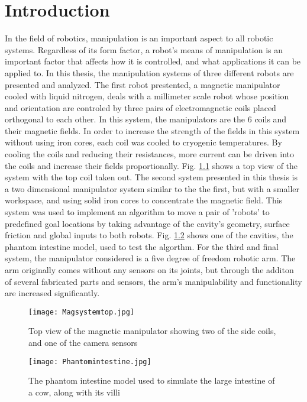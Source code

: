 
\chapter[Introduction]{Introduction}
\label{chap-intro}

In the field of robotics, manipulation is an important aspect to all robotic systems. Regardless of its form factor, a robot's means of manipulation is an important factor that affects how it is controlled, and what applications it can be applied to. In this thesis, the manipulation systems of three different robots are presented and analyzed. The first robot prestented, a magnetic manipulator cooled with liquid nitrogen, deals with a millimeter scale robot whose position and orientation are controled by three pairs of electromagnetic coils placed orthogonal to each other. In this system, the manipulators are the 6 coils and their magnetic fields. In order to increase the strength of the fields in this system without using iron cores, each coil was cooled to cryogenic temperatures.  By cooling the coils and reducing their resistances, more current can be driven into the coils and increase their fields proportionally.  Fig. \ref{MagTopPic} shows a top view of the system with the top coil taken out.  The second system presented in this thesis is a two dimensional manipulator system similar to the the first, but with a smaller workspace, and using solid iron cores to concentrate the magnetic field. This system was used to implement an algorithm to move a pair of 'robots' to predefined goal locations by taking advantage of the cavity's geometry, surface friction and global inputs to both robots. Fig. \ref{Intestine} shows one of the cavities, the phantom intestine model, used to test the algorthm.  For the third and final system, the manipulator considered is a five degree of freedom robotic arm. The arm originally comes without any sensors on its joints, but through the additon of several fabricated parts and sensors, the arm's manipulability and functionality are increased significantly. 


\begin{figure}
\centering
	\texttt{[image: Magsystemtop.jpg]}
	\caption{Top view of the magnetic manipulator showing  two of the side coils, and one of the camera sensors}
	\label{MagTopPic}
\end{figure}  
\begin{figure}
\centering
	\texttt{[image: Phantomintestine.jpg]}
	\caption{The phantom intestine model used to simulate the large intestine of a cow, along with its villi}
	\label{Intestine}
\end{figure} 